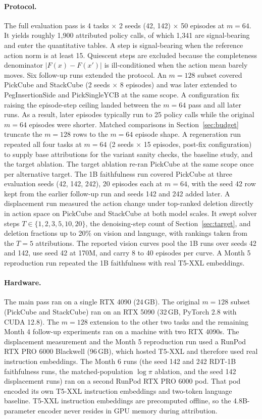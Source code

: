 \documentclass{article}
\begin{document}
\paragraph{Protocol.}
The full evaluation pass is 4 tasks $\times$ 2 seeds (42, 142) $\times$ 50 episodes at $m{=}64$.
It yields roughly 1{,}900 attributed policy calls, of which 1{,}341 are signal-bearing and enter the quantitative tables.
A step is signal-bearing when the reference action norm is at least 15.
Quiescent steps are excluded because the completeness denominator $|F(x) - F(x')|$ is ill-conditioned when the action mean barely moves.
Six follow-up runs extended the protocol.
An $m{=}128$ subset covered PickCube and StackCube (2 seeds $\times$ 8 episodes) and was later extended to PegInsertionSide and PickSingleYCB at the same scope.
A configuration fix raising the episode-step ceiling landed between the $m{=}64$ pass and all later runs.
As a result, later episodes typically run to 25 policy calls while the original $m{=}64$ episodes were shorter.
Matched comparisons in Section~\ref{sec:budget} truncate the $m{=}128$ rows to the $m{=}64$ episode shape.
A regeneration run repeated all four tasks at $m{=}64$ (2 seeds $\times$ 15 episodes, post-fix configuration) to supply base attributions for the variant sanity checks, the baseline study, and the target ablation.
The target ablation re-ran PickCube at the same scope once per alternative target.
The 1B faithfulness run covered PickCube at three evaluation seeds (42, 142, 242), 20 episodes each at $m{=}64$, with the seed 42 row kept from the earlier follow-up run and seeds 142 and 242 added later.
A displacement run measured the action change under top-ranked deletion directly in action space on PickCube and StackCube at both model scales.
It swept solver steps $T \in \{1, 2, 3, 5, 10, 20\}$, the denoising-step count of Section~\ref{sec:target}, and deletion fractions up to 20\% on vision and language, with rankings taken from the $T{=}5$ attributions.
The reported vision curves pool the 1B runs over seeds 42 and 142, use seed 42 at 170M, and carry 8 to 40 episodes per curve.
A Month 5 reproduction run repeated the 1B faithfulness with real T5-XXL embeddings.

\paragraph{Hardware.}
The main pass ran on a single RTX 4090 (24\,GB).
The original $m{=}128$ subset (PickCube and StackCube) ran on an RTX 5090 (32\,GB, PyTorch 2.8 with CUDA 12.8).
The $m{=}128$ extension to the other two tasks and the remaining Month 4 follow-up experiments ran on a machine with two RTX 4090s.
The displacement measurement and the Month 5 reproduction run used a RunPod RTX PRO 6000 Blackwell (96\,GB), which hosted T5-XXL and therefore used real instruction embeddings.
The Month 6 runs (the seed 142 and 242 RDT-1B faithfulness runs, the matched-population $\log\pi$ ablation, and the seed 142 displacement runs) ran on a second RunPod RTX PRO 6000 pod.
That pod encoded its own T5-XXL instruction embeddings and two-token language baseline.
T5-XXL instruction embeddings are precomputed offline, so the 4.8B-parameter encoder never resides in GPU memory during attribution.
\end{document}
